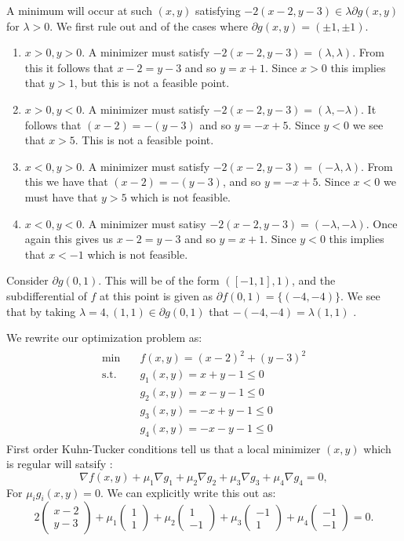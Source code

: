 \documentclass[12pt, a4paper]{article}
\theoremstyle{definition}
\newcommand{\grad}{\nabla}
\newcommand{\pmat}[1]{\begin{pmatrix}#1\end{pmatrix}}
\begin{document}
A minimum will occur at such $(x,y)$ satisfying $-2(x-2,y-3) \in \lambda \partial g(x,y)$ for $\lambda>0$.
We first rule out and of the cases where $\partial g(x,y) = (\pm 1, \pm 1)$. 
\begin{enumerate}[label = \bf{Case \roman*)}]
	\item $x>0,y>0$. A minimizer must satisfy $-2(x-2,y-3) = (\lambda, \lambda)$. From this it follows that $x-2 = y-3$ and so $y = x+1$. Since $x>0$ this implies that $y>1$, but this is not a feasible point. 
	\item $x>0, y<0$. A minimizer must satisfy $-2(x-2,y-3) = (\lambda , -\lambda)$. It follows that $(x-2) = -(y-3)$ and so $y = -x+5$. Since $y<0$ we see that $x>5$. This is not a feasible point. 
	\item $x<0, y>0$. A minimizer must satisfy $-2(x-2,y-3) = (-\lambda, \lambda)$. From this we have that $(x-2) = -(y-3)$, and so $ y = -x+5$. Since $x<0$ we must have that $y>5$ which is not feasible. 
	\item $x<0, y<0$. A minimizer must satisy $-2(x-2, y-3) = (-\lambda , - \lambda)$. Once again this gives us $x-2 = y-3$ and so $y = x+1$. Since $y<0$ this implies that $x<-1$ which is not feasible. 
\end{enumerate}
Consider $\partial g(0,1)$. This will be of the form $([-1,1], 1)$, and the subdifferential of $f$ at this point is given as $\partial f(0,1) = \{(-4,-4)\}$. We see that by taking $\lambda = 4, (1,1) \in \partial g(0,1)$ that $-(-4,-4) = \lambda(1,1)$ . 
\item We rewrite our optimization problem as: 
	\begin{align*}
	\begin{aligned}
		\min \quad & f(x,y) = (x-2)^2 + (y-3)^2
		\\ \textrm{s.t.} \quad & g_1(x,y) = x+y-1\leq 0
		\\ \quad & g_2(x,y) = x-y-1\leq 0
		\\ \quad & g_3(x,y) = -x+y - 1 \leq 0 
		\\ \quad & g_4(x,y) = -x-y-1\leq 0
	\end{aligned}
	\end{align*}
First order Kuhn-Tucker conditions tell us that a local minimizer $(x,y)$ which is regular will satsify :
$$\grad f (x,y)  + \mu_1 \grad g_1 + \mu_2 \grad g_2 + \mu_3 \grad g_3 + \mu_4 \grad g_4 = 0,$$
For $\mu_i g_i(x,y) = 0$. We can explicitly write this out as: 
$$2 \pmat{x-2 \\ y-3} + \mu_1 \pmat{1 \\ 1 } + \mu_2 \pmat{1 \\ -1} + \mu_3 \pmat{-1 \\ 1} + \mu_4\pmat{-1 \\ -1} = 0.$$
\end{document}
